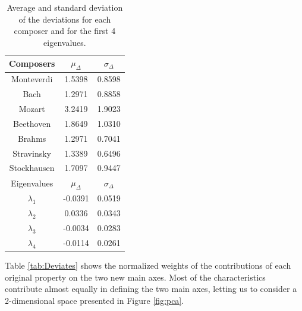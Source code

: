 \documentclass[
 aip,
 jmp,
 amsmath,amssymb,
 reprint,
]{revtex4-1}
\begin{document}
\begin{table}%
\caption{\label{tab:tableD}Average and standard deviation of the 
deviations for each composer and for the first 
4 eigenvalues.}

\begin{tabular}{|c||c|c|}
\hline

Composers & $\mu_{\Delta}$ & $\sigma_{\Delta}$ \\
\hline

Monteverdi     & 1.5398 & 0.8598 \\
Bach           & 1.2971 & 0.8858 \\
Mozart         & 3.2419 & 1.9023 \\
Beethoven      & 1.8649 & 1.0310 \\
Brahms         & 1.2971 & 0.7041 \\
Stravinsky     & 1.3389 & 0.6496 \\
Stockhausen    & 1.7097 & 0.9447 \\
\hline \hline
Eigenvalues & $\mu_{\Delta}$ & $\sigma_{\Delta}$ \\
\hline
$\lambda_1$ &  -0.0391 & 0.0519 \\
$\lambda_2$ &   0.0336 & 0.0343 \\
$\lambda_3$ &  -0.0034 & 0.0283 \\
$\lambda_4$ &  -0.0114 & 0.0261 \\
\hline

\end{tabular}
\end{table}

Table \ref{tab:Deviates} shows the normalized weights
of the contributions of each original property on the two
new main axes. Most of the characteristics contribute almost equally
in defining the two main axes, letting us to consider a 2-dimensional
space presented in Figure \ref{fig:pca}.
\end{document}
